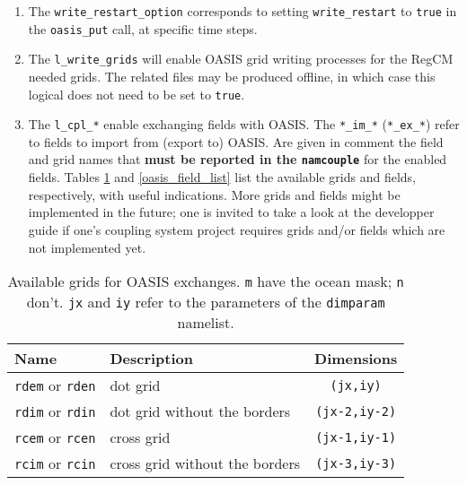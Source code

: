 \begin{enumerate}
\item The \verb=write_restart_option= corresponds to setting
\verb=write_restart= to \verb=true= in the \verb=oasis_put= call, at
specific time steps.
\item The \verb=l_write_grids= will enable OASIS grid writing processes for
the RegCM needed grids. The related files may be produced offline, in which
case this logical does not need to be set to \verb=true=.
\item The \verb=l_cpl_*= enable exchanging fields with OASIS. The
\verb=*_im_*= (\verb=*_ex_*=) refer to fields to import from (export to)
OASIS. Are given in comment the field and grid names that {\bf must be reported
in the \verb=namcouple=} for the enabled fields. Tables \ref{oasis_grid_list}
and \ref{oasis_field_list} list the available grids and fields, respectively,
with useful indications. More grids and fields might be implemented in the
future; one is invited to take a look at the developper guide if one's
coupling system project requires grids and/or fields which are not
implemented yet.
\end{enumerate}

\begin{table}[ht]
\caption{Available grids for OASIS exchanges. {\tt *m} have the ocean
         mask; {\tt *n} don't. {\tt jx} and {\tt iy} refer to the
         parameters of the {\tt dimparam} namelist.}
\vspace{0.05 in}
\centering
\begin{tabular}{l|l|c}
\hline
Name & Description & Dimensions\\
\hline
\verb=rdem= or \verb=rden= & dot grid & \verb=(jx,iy)=\\
\verb=rdim= or \verb=rdin= & dot grid without the borders & \verb=(jx-2,iy-2)=\\
\verb=rcem= or \verb=rcen= & cross grid & \verb=(jx-1,iy-1)=\\
\verb=rcim= or \verb=rcin= & cross grid without the borders & \verb=(jx-3,iy-3)=\\
\hline
\end{tabular}
\label{oasis_grid_list}
\end{table}

